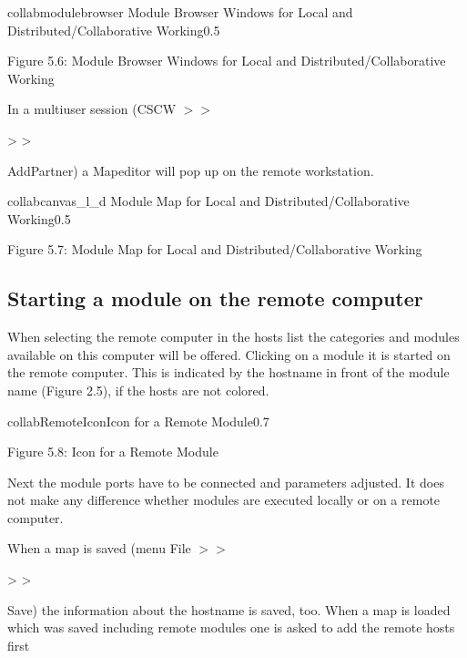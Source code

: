 \begin{covimg}{collab}{modulebrowser}
    {Module Browser Windows for Local and Distributed/Collaborative Working}{0.5}\end{covimg}
\begin{htmlonly}
Figure 5.6: Module Browser Windows for Local and Distributed/Collaborative Working
\vspace{1cm}
\end{htmlonly}

In a multiuser session (CSCW \latexonly $>>$ \endlatexonly \begin{htmlonly} > >
\end{htmlonly} AddPartner) a Mapeditor will pop up on the remote workstation.

\begin{covimg}{collab}{canvas_l_d}
           {Module Map for Local and Distributed/Collaborative Working}{0.5}\end{covimg}
\begin{htmlonly}
Figure 5.7: Module Map for Local and Distributed/Collaborative Working
\vspace{1cm}
\end{htmlonly}
\clearpage


\subsection{Starting a module on the remote computer}


When selecting the remote computer in the hosts list the categories and modules 
available on this computer will be offered. Clicking on a module it is started on the 
remote computer. This is indicated by the hostname in front of the module 
name (Figure 2.5), if the hosts are not colored.

                              
\begin{covimg}{collab}{RemoteIcon}{Icon  for a Remote Module}{0.7}\end{covimg}
\begin{htmlonly}
Figure 5.8: Icon  for a Remote Module
\vspace{0.5cm}
\end{htmlonly}

Next the module ports have to be connected and parameters adjusted. It does not make 
any difference whether modules are executed locally or on a remote computer.

When a map is saved (menu File \latexonly $>>$ \endlatexonly \begin{htmlonly} > > \end{htmlonly} Save) the information about the hostname is 
saved, too. When a map is loaded which was saved including remote modules one is 
asked to add the remote hosts first



